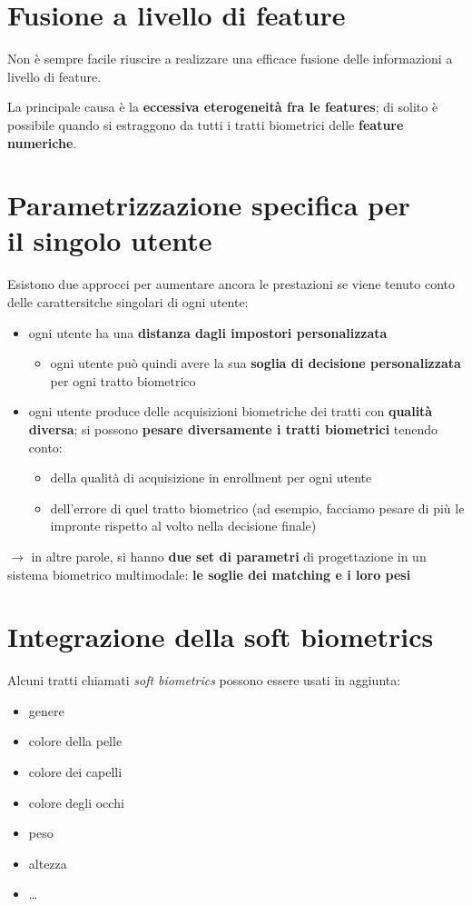 \documentclass{report}
\begin{document}
\section{Fusione a livello di feature}
Non è sempre facile riuscire a realizzare una efficace fusione delle informazioni 
a livello di feature. 

\noindent La principale causa è la \textbf{eccessiva eterogeneità fra le features};
di solito è possibile quando si estraggono da tutti i tratti biometrici delle 
\textbf{feature numeriche}.

\newpage
\section{Parametrizzazione specifica per \\ il singolo utente}
Esistono due approcci per aumentare ancora le prestazioni se viene tenuto conto delle carattersitche 
singolari di ogni utente:
\begin{itemize}
    \item ogni utente ha una \textbf{distanza dagli impostori personalizzata}
    \begin{itemize}
        \item ogni utente può quindi avere la sua \textbf{soglia di decisione personalizzata} per ogni tratto biometrico 
    \end{itemize}
    \item ogni utente produce delle acquisizioni biometriche dei tratti con \textbf{qualità diversa}; si possono 
    \textbf{pesare diversamente i tratti biometrici} tenendo conto:
    \begin{itemize}
        \item della qualità di acquisizione in enrollment per ogni utente 
        \item dell'errore di quel tratto biometrico (ad esempio, facciamo pesare di più le impronte 
        rispetto al volto nella decisione finale)
    \end{itemize}
\end{itemize}

\noindent$\rightarrow$ in altre parole, si hanno \textbf{due set di parametri} di progettazione
in un sistema biometrico multimodale: \textbf{le soglie dei matching e i loro pesi}

\section{Integrazione della soft biometrics}
Alcuni tratti chiamati \textit{soft biometrics} possono essere usati in aggiunta:
\begin{itemize}
    \item genere 
    \item colore della pelle 
    \item colore dei capelli 
    \item colore degli occhi 
    \item peso 
    \item altezza
    \item \dots
\end{itemize}
\end{document}
